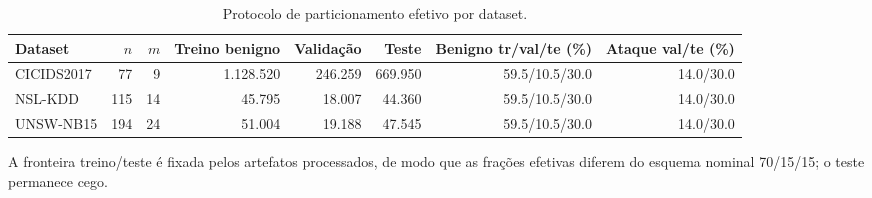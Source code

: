 \begin{table}[htbp]
\centering
\caption{Protocolo de particionamento efetivo por dataset.}
\label{tab:particionamento}
\small
\begin{tabular}{lrrrrrrr}
\hline
Dataset & $n$ & $m$ & Treino benigno & Validação & Teste & Benigno tr/val/te (\%) & Ataque val/te (\%) \\
\hline
CICIDS2017 & 77 & 9 & 1.128.520 & 246.259 & 669.950 & 59.5/10.5/30.0 & 14.0/30.0 \\
NSL-KDD & 115 & 14 & 45.795 & 18.007 & 44.360 & 59.5/10.5/30.0 & 14.0/30.0 \\
UNSW-NB15 & 194 & 24 & 51.004 & 19.188 & 47.545 & 59.5/10.5/30.0 & 14.0/30.0 \\
\hline
\end{tabular}
\begin{flushleft}\footnotesize A fronteira treino/teste é fixada pelos artefatos processados, de modo que as frações efetivas diferem do esquema nominal 70/15/15; o teste permanece cego.\end{flushleft}
\end{table}
